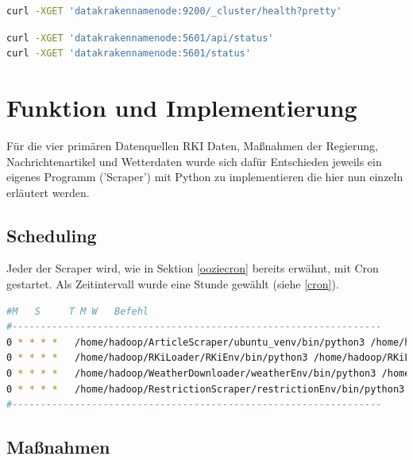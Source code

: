 \documentclass[12pt,oneside,a4paper,parskip]{scrbook}
\begin{document}
\begin{lstlisting}[caption=Statusabfrage Elasticsearch,label=statuselastic,language=bash]
curl -XGET 'datakrakennamenode:9200/_cluster/health?pretty'
\end{lstlisting}

\begin{lstlisting}[caption=Statusabfrage Kibana,label=statuskibana,language=bash]
curl -XGET 'datakrakennamenode:5601/api/status'
curl -XGET 'datakrakennamenode:5601/status'
\end{lstlisting}





\chapter{Funktion und Implementierung}

Für die vier primären Datenquellen RKI Daten, Maßnahmen der Regierung, Nachrichtenartikel und Wetterdaten wurde sich daf\"ur Entschieden jeweils ein eigenes Programm ('Scraper') mit Python zu implementieren die hier nun einzeln erläutert werden. \newline

\section{Scheduling}
Jeder der Scraper wird, wie in Sektion \ref{ooziecron} bereits erwähnt, mit Cron gestartet. Als Zeitintervall wurde eine Stunde gewählt (siehe \ref{cron}). \newline

\begin{lstlisting}[caption=Cron-einstellungen,label=cron,language=bash]
#M   S     T M W   Befehl
#-----------------------------------------------------------------
0 * * * *   /home/hadoop/ArticleScraper/ubuntu_venv/bin/python3 /home/hadoop/ArticleScraper/main.py
0 * * * *   /home/hadoop/RKiLoader/RKiEnv/bin/python3 /home/hadoop/RKiLoader/main.py
0 * * * *   /home/hadoop/WeatherDownloader/weatherEnv/bin/python3 /home/hadoop/WeatherDownloader/__main__.py
0 * * * *   /home/hadoop/RestrictionScraper/restrictionEnv/bin/python3 /home/hadoop/RestrictionScraper/main.py
#-----------------------------------------------------------------
\end{lstlisting}

\pagebreak

\section{Maßnahmen}
\end{document}
